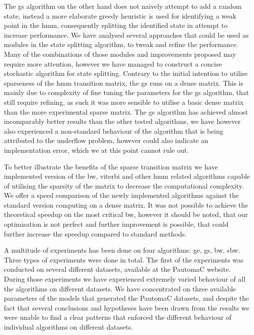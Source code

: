 The \acrlong{gs} algorithm on the other hand does not naively attempt to add a random state, instead a more elaborate greedy heuristic is used for identifying a weak point in the \gls{hmm}, consequently splitting the identified state in attempt to increase performance. We have analysed several approaches that could be used as modules in the state splitting algorithm, to tweak and refine the performance. Many of the combinations of those modules and improvements proposed may require more attention, however we have managed to construct a concise stochastic algorithm for state splitting. Contrary to the initial intention to utilise sparseness of the \gls{hmm} transition matrix, the \gls{gs} runs on a dense matrix. This is mainly due to complexity of fine tuning the parameters for the \gls{gs} algorithm, that still require refining, as such it was more sensible to utilise a basic dense matrix than the more experimental sparse matrix. The \gls{gs} algorithm has achieved almost incomparably better results than the other tested algorithms, we have however also experienced a non-standard behaviour of the algorithm that is being attributed to the underflow problem, however could also indicate an implementation error, which we at this point cannot rule out.

To better illustrate the benefits of the sparse transition matrix we have implemented version of the \gls{bw}, \gls{viterbi} and other \gls{hmm} related algorithms capable of utilising the sparsity of the matrix to decrease the computational complexity. We offer a speed comparison of the newly implemented algorithms against the standard version computing on a dense matrix. It was not possible to achieve the theoretical speedup on the most critical \gls{bw}, however it should be noted, that our optimisation is not perfect and further improvement is possible, that could further increase the speedup compared to standard methods.

A multitude of experiments has been done on four algorithms: \acrlong{ge}, \acrlong{gs}, \acrlong{bw}, \acrlong{sbw}. Three types of experiments were done in total. The first of the experiments was conducted on several different datasets, available at the PautomaC website. During those experiments we have experienced extremely varied behaviour of all the algorithms on different datasets. We have concentrated on three available parameters of the models that generated the PautomaC datasets, and despite the fact that several conclusions and hypotheses have been drawn from the results we were unable to find a clear patterns that enforced the different behaviour of individual algorithms on different datasets.

